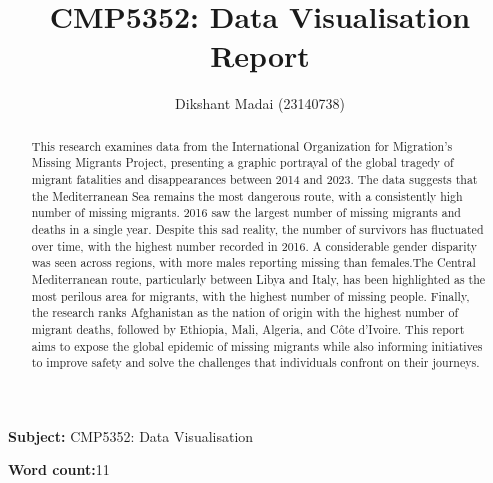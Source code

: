 \documentclass{article}
\title{\Huge CMP5352: Data Visualisation Report}
\author{\Large Dikshant Madai (23140738)}
\begin{document}
\maketitle
\begin{center}
    \textbf{Subject:} {CMP5352: Data Visualisation}
\end{center}
\begin{center}
    \textbf{Word count:}{11 }  %
\end{center}



 
\maketitle
\newpage
\tableofcontents
\newpage

\begin{abstract}
This research examines data from the International Organization for Migration's Missing Migrants Project, presenting a graphic portrayal of the global tragedy of migrant fatalities and disappearances between 2014 and 2023. The data suggests that the Mediterranean Sea remains the most dangerous route, with a consistently high number of missing migrants. 2016 saw the largest number of missing migrants and deaths in a single year. Despite this sad reality, the number of survivors has fluctuated over time, with the highest number recorded in 2016.  A considerable gender disparity was seen across regions, with more males reporting missing than females.The Central Mediterranean route, particularly between Libya and Italy, has been highlighted as the most perilous area for migrants, with the highest number of missing people. Finally, the research ranks Afghanistan as the nation of origin with the highest number of migrant deaths, followed by Ethiopia, Mali, Algeria, and Côte d'Ivoire. This report aims to expose the global epidemic of missing migrants while also informing initiatives to improve safety and solve the challenges that individuals confront on their journeys.
\end{abstract}

\newpage
\end{document}
